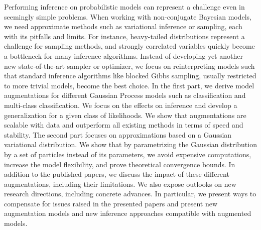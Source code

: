 
\ifCLASSINFOlangDE
{}
\fi

\begin{abstracts}        %
Performing inference on probabilistic models can represent a challenge even in seemingly simple problems.
When working with non-conjugate Bayesian models, we need approximate methods such as variational inference or sampling, each with its pitfalls and limits.
For instance, heavy-tailed distributions represent a challenge for sampling methods, and strongly correlated variables quickly become a bottleneck for many inference algorithms.
Instead of developing yet another new state-of-the-art sampler or optimizer, we focus on reinterpreting models such that standard inference algorithms like blocked Gibbs sampling, usually restricted to more trivial models, become the best choice.
In the first part, we derive model augmentations for different Gaussian Process models such as classification and multi-class classification.
We focus on the effects on inference and develop a generalization for a given class of likelihoods.
We show that augmentations are scalable with data and outperform all existing methods in terms of speed and stability.
The second part focuses on approximations based on a Gaussian variational distribution.
We show that by parametrizing the Gaussian distribution by a set of particles instead of its parameters, we avoid expensive computations, increase the model flexibility, and prove theoretical convergence bounds.
In addition to the published papers, we discuss the impact of these different augmentations, including their limitations.
We also expose outlooks on new research directions, including concrete advances.
In particular, we present ways to compensate for issues raised in the presented papers and present new augmentation models and new inference approaches compatible with augmented models.
\end{abstracts}
\ifCLASSINFOlangDE
{}
\fi

